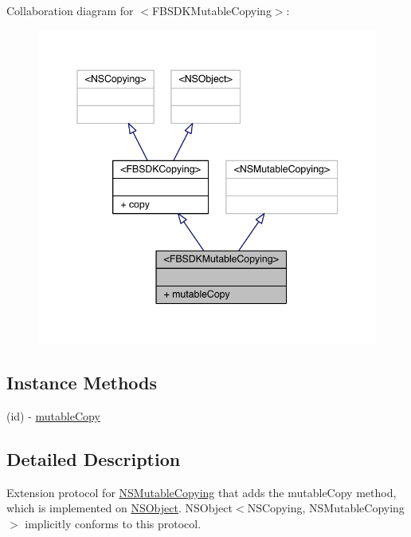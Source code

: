 Collaboration diagram for $<$F\-B\-S\-D\-K\-Mutable\-Copying$>$\-:
\nopagebreak
\begin{figure}[H]
\begin{center}
\leavevmode
\includegraphics[width=345pt]{protocol_f_b_s_d_k_mutable_copying-p__coll__graph}
\end{center}
\end{figure}
\subsection*{Instance Methods}
\begin{DoxyCompactItemize}
\item 
(id) -\/ \hyperlink{protocol_f_b_s_d_k_mutable_copying-p_a66d18ba51304f927a71d669edeec6f08}{mutable\-Copy}
\end{DoxyCompactItemize}


\subsection{Detailed Description}
Extension protocol for \hyperlink{class_n_s_mutable_copying-p}{N\-S\-Mutable\-Copying} that adds the mutable\-Copy method, which is implemented on \hyperlink{class_n_s_object-p}{N\-S\-Object}.  N\-S\-Object$<$\-N\-S\-Copying, N\-S\-Mutable\-Copying$>$ implicitly conforms to this protocol. 

